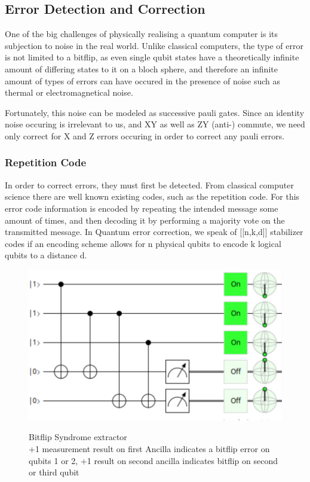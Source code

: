 \subsection{Error Detection and Correction}
One of the big challenges of physically realising a quantum 
computer is its subjection to noise in the real world.
Unlike classical computers, the type of error is not limited
to a bitflip, as even single qubit states have a theoretically
infinite amount of differing states to it on a bloch sphere,
and therefore an infinite amount of types of errors can have
occured in the presence of noise such as thermal or electromagnetical
noise.

Fortunately, this noise can be modeled as successive pauli gates.
Since an identity noise occuring is irrelevant to us, and XY as
well as ZY (anti-) commute, we need only correct for X and Z
errors occuring in order to correct any pauli errors. 

\subsubsection{Repetition Code}
In order to correct errors, they must first be detected.
From classical computer science there are well known existing
codes, such as the repetition code.
For this error code information is encoded by repeating the 
intended message some amount of times, and then decoding it
by performing a majority vote on the transmitted message.
In Quantum error correction, we speak of [[n,k,d]] stabilizer
codes if an encoding scheme allows for n physical qubits to 
encode k logical qubits to a distance d.

\begin{figure}[h!]
	\begin{center}
	\captionsetup{justification=centering,margin=2cm}
	\includegraphics[scale=0.2]{./img/bitflipSyndromeExtraction3Rep.png}\\
	\caption{Bitflip Syndrome extractor\\
        +1 measurement result on first Ancilla indicates a bitflip error
        on qubits 1 or 2, +1 result on second ancilla indicates 
		bitflip on second or third qubit}
	\label{fig: syndrome extractor}
	\end{center}
\end{figure}

